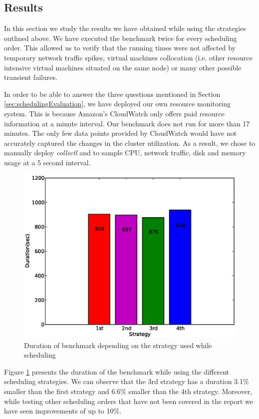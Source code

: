 \documentclass[11pt,a4paper,twoside]{report}
\begin{document}
\subsection{Results}
In this section we study the results we have obtained while using the strategies outlined above. We have executed the benchmark twice for every scheduling order. This allowed us to verify that the running times were not affected by temporary network traffic spikes, virtual machines collocation (i.e. other resource intensive virtual machines situated on the same node) or many other possible transient failures.


In order to be able to answer the three questions mentioned in Section \ref{sec:schedulingEvaluation}, we have deployed our own resource monitoring system. This is because Amazon's CloudWatch only offers paid resource information at a minute interval. Our benchmark does not run for more than 17 minutes. The only few data points provided by CloudWatch would have not accurately captured the changes in the cluster utilization. As a result, we chose to manually deploy \textit{collectl} and to sample CPU, network traffic, disk and memory usage at a 5 second interval.

\begin{figure}[h]
\centering
\includegraphics[scale=0.40]{benchmark-duration}
\caption{Duration of benchmark depending on the strategy used while scheduling}
\label{fig:BenchmarkDuration}
\end{figure}


Figure \ref{fig:BenchmarkDuration} presents the duration of the benchmark while using the different scheduling strategies. We can observe that the 3rd strategy has a duration 3.1\% smaller than the first strategy and 6.6\% smaller than the 4th strategy. Moreover, while testing other scheduling orders that have not been covered in the report we have seen improvements of up to 10\%.
\end{document}
